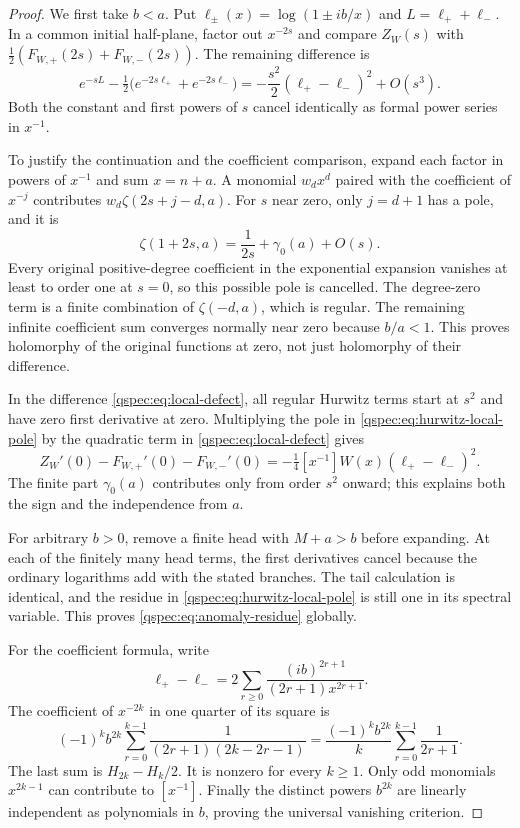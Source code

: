 \begin{proof}
We first take $b<a$. Put $\ell_\pm(x)=\log(1\pm ib/x)$ and
$L=\ell_++\ell_-$. In a common initial half-plane, factor out $x^{-2s}$
and compare $Z_W(s)$ with
$\tfrac12(F_{W,+}(2s)+F_{W,-}(2s))$. The remaining difference is
\begin{equation}\label{qspec:eq:local-defect}
e^{-sL}-\tfrac12\bigl(e^{-2s\ell_+}+e^{-2s\ell_-}\bigr)
=-\frac{s^2}{2}(\ell_+-\ell_-)^2+O(s^3).
\end{equation}
Both the constant and first powers of $s$ cancel identically as formal
power series in $x^{-1}$.

To justify the continuation and the coefficient comparison, expand each
factor in powers of $x^{-1}$ and sum $x=n+a$. A monomial $w_dx^d$
paired with the coefficient of $x^{-j}$ contributes
$w_d\zeta(2s+j-d,a)$. For $s$ near zero, only $j=d+1$ has a pole,
and it is
\begin{equation}\label{qspec:eq:hurwitz-local-pole}
\zeta(1+2s,a)=\frac1{2s}+\gamma_0(a)+O(s).
\end{equation}
Every original positive-degree coefficient in the exponential expansion
vanishes at least to order one at $s=0$, so this possible pole is
cancelled. The degree-zero term is a finite combination of $\zeta(-d,a)$,
which is regular. The remaining infinite coefficient sum converges
normally near zero because $b/a<1$. This proves holomorphy of the
original functions at zero, not just holomorphy of their difference.

In the difference \eqref{qspec:eq:local-defect}, all regular Hurwitz
terms start at $s^2$ and have zero first derivative at zero. Multiplying
the pole in \eqref{qspec:eq:hurwitz-local-pole} by the quadratic term
in \eqref{qspec:eq:local-defect} gives
\[
Z_W'(0)-F_{W,+}'(0)-F_{W,-}'(0)
=-\tfrac14[x^{-1}]W(x)(\ell_+-\ell_-)^2.
\]
The finite part $\gamma_0(a)$ contributes only from order $s^2$ onward;
this explains both the sign and the independence from $a$.

For arbitrary $b>0$, remove a finite head with $M+a>b$ before expanding.
At each of the finitely many head terms, the first derivatives cancel
because the ordinary logarithms add with the stated branches. The tail
calculation is identical, and the residue in
\eqref{qspec:eq:hurwitz-local-pole} is still one in its spectral variable.
This proves \eqref{qspec:eq:anomaly-residue} globally.

For the coefficient formula, write
\[
\ell_+-\ell_-=2\sum_{r\ge0}\frac{(ib)^{2r+1}}{(2r+1)x^{2r+1}}.
\]
The coefficient of $x^{-2k}$ in one quarter of its square is
\[
(-1)^kb^{2k}\sum_{r=0}^{k-1}
\frac1{(2r+1)(2k-2r-1)}
=\frac{(-1)^kb^{2k}}k\sum_{r=0}^{k-1}\frac1{2r+1}.
\]
The last sum is $H_{2k}-H_k/2$. It is nonzero for every $k\ge1$.
Only odd monomials $x^{2k-1}$ can contribute to $[x^{-1}]$.
Finally the distinct powers $b^{2k}$ are linearly independent as
polynomials in $b$, proving the universal vanishing criterion.
\end{proof}


